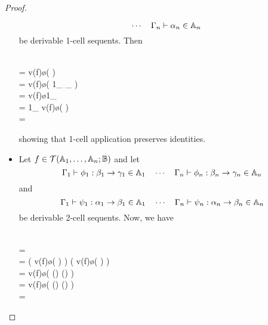 \documentclass{robinthesisdraft}
\begin{document}
\begin{proof}
\begin{itemize}
\[			\quad\cdots\quad
			\Gamma_{n}\vdash \alpha_{n}\in \mathbb{A}_{n}
		\]
		be derivable 1-cell sequents. Then
		\begin{mmulti}[.5em]
			\\= v(f)\o\Bigl(
				\tn\cdots\tn
			\Bigr)
			\\= v(f)\o\Bigl(
				1_{}
				\tn\cdots{}_{}
			\Bigr)
			\\= v(f)\o1_{
				\tn\cdots\tn
			}
			\\= 1_{
				v(f)\o(
					\tn\cdots\tn
				)
			}
			\\= 
		\end{mmulti}
		showing that 1-cell application preserves identities.
	\item Let $f\in{\mathcal{T}}(\mathbb{A}_{1},\dots,\mathbb{A}_{n};\mathbb{B})$ and let
		\[
			\Gamma_{1}\vdash\phi_{1}: \beta_{1}\to\gamma_{1}\in\mathbb{A}_{1}
			\quad\cdots\quad
			\Gamma_{n}\vdash\phi_{n}: \beta_{n}\to\gamma_{n}\in\mathbb{A}_{n}
		\]
		and
		\[
			\Gamma_{1}\vdash\psi_{1}: \alpha_{1}\to\beta_{1}\in\mathbb{A}_{1}
			\quad\cdots\quad
			\Gamma_{n}\vdash\psi_{n}: \alpha_{n}\to\beta_{n}\in\mathbb{A}_{n}
		\]
		be derivable 2-cell sequents. Now, we have
		\begin{mmulti}[1em]
			\\=
			\cdot
			\\=
			\bigl( v(f)\o (
				\tn\cdots{}
			) \bigr)
			\cdot
			\bigl( v(f)\o (
				\tn\cdots{}
			) \bigr)
			\\=
			v(f)\o\bigl(
				(\tn\cdots{})
				\cdot (\tn\cdots{})
			\bigr)
			\\=
			v(f)\o\bigl(
				(\cdot{})
				\tn\cdots\tn
				(\cdot{})
			\bigr)
			\\=

\end{mmulti}
\end{itemize}
\end{proof}
\end{document}
